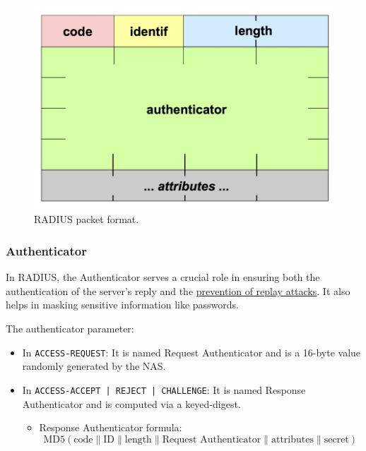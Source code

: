 \begin{figure}[H]
    \includegraphics[width=\linewidth]{Images/NetSec/radius_packet_format.png}
    \caption{RADIUS packet format.}
    
\end{figure}

\subsubsection{Authenticator}
In RADIUS, the Authenticator serves a crucial role in ensuring both the authentication of the server’s reply and the \underline{prevention of replay attacks}. It also helps in masking sensitive information like passwords.

\hfill

The authenticator parameter:
\begin{itemize}
    \item In \texttt{ACCESS-REQUEST}: It is named Request Authenticator and is a 16-byte value randomly generated by the NAS.
    \item In \texttt{ACCESS-ACCEPT | REJECT | CHALLENGE}: It is named Response Authenticator and is computed via a keyed-digest.
    \begin{itemize}
        \item Response Authenticator formula:
        \begin{equation*}
            \text{MD5}(\text{code} \| \text{ID} \| \text{length} \|\text{Request Authenticator} \| \text{attributes} \| \text{secret})
        \end{equation*}
    \end{itemize}
\end{itemize}


